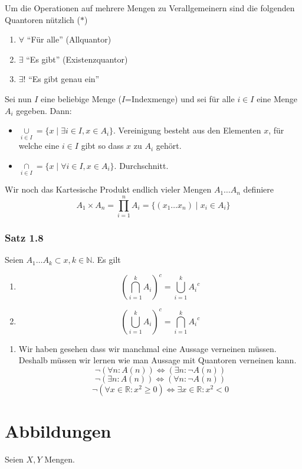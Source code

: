 Um die Operationen auf mehrere Mengen zu Verallgemeinern sind die folgenden Quantoren nützlich ($\ast$)
\begin{enumerate}
\item $\forall$ ``Für alle'' (Allquantor)
\item $\exists$ ``Es gibt'' (Existenzquantor)
\item $\exists !$ ``Es gibt genau ein''
\end{enumerate}
Sei nun $I$ eine beliebige Menge ($I$=Indexmenge) und sei für alle $i\in I$ eine Menge $A_i$ gegeben. Dann:
\begin{itemize}
\item $\mathop { \cup {A_i}}\limits_{i \in I} = \{x\mid \exists i\in I,x\in A_i\}$. Vereinigung besteht aus den Elementen $x$, für welche eine $i\in I$ gibt so dass $x$ zu $A_i$ gehört.
\item  $\mathop { \cap {A_i}}\limits_{i \in I} = \{x\mid \forall i\in I,x\in A_i\}$. Durchschnitt. 
\end{itemize}
Wir  noch das Kartesische Produkt endlich vieler Mengen $A_1 \dots A_n$ definiere \[{A_1} \times {A_n} = \prod\limits_{i = 1}^n {{A_i} = \{ ({x_1} \ldots {x_n})\mid {x_i} \in {A_i}} \} \]

\subsubsection*{Satz 1.8}
Seien $A_1 \dots A_k \subset x,k\in \mathbb{N}$. Es gilt
\begin{enumerate}
\item \[{\left( {\bigcap\limits_{i = 1}^k {{A_i}} } \right)^c} = \bigcup\limits_{i = 1}^k {{A_i}^c} \]
\item \[{\left( {\bigcup\limits_{i = 1}^k {{A_i}} } \right)^c} = \bigcap\limits_{i = 1}^k {{A_i}^c} \]
\end{enumerate}
\begin{enumerate}[($\ast$)]
\item Wir haben gesehen dass wir manchmal eine Aussage verneinen müssen. Deshalb müssen wir lernen wie man Aussage mit Quantoren verneinen kann.
$$\neg\left(\forall n:A(n)\right)\Leftrightarrow\left(\exists n:\neg A(n)\right)$$
$$\neg\left(\exists n:A(n)\right)\Leftrightarrow\left(\forall n:\neg A(n)\right)$$
$$\neg\left(\forall x\in \mathbb{R}:x^2\geq 0\right)\Leftrightarrow\exists x\in\mathbb{R}:x^2<0$$
\end{enumerate}
\section{Abbildungen}
Seien $X,Y$ Mengen. 
